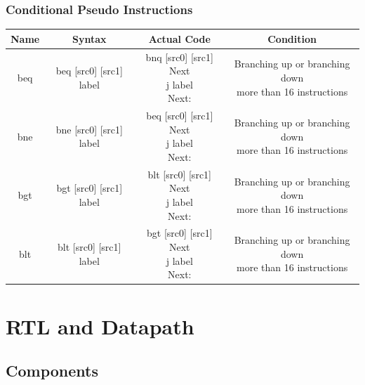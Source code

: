 \documentclass{article}
\begin{document}
		\subsubsection{Conditional Pseudo Instructions}
			\begin{center} \begin{tabular}{| c | c | c | c |} \hline
				Name & Syntax                    & Actual Code & Condition \\ \hline
				beq  & beq [src0] [src1] label & \thead{bnq [src0] [src1] Next \\ j label \\ Next:} & \thead{Branching up or branching down \\ more than 16 instructions}\\ \hline
				bne  & bne [src0] [src1] label & \thead{beq [src0] [src1] Next \\ j label \\ Next:} & \thead{Branching up or branching down \\ more than 16 instructions}\\ \hline
				bgt  & bgt [src0] [src1] label & \thead{blt [src0] [src1] Next \\ j label \\ Next:} & \thead{Branching up or branching down \\ more than 16 instructions}\\ \hline
				blt  & blt [src0] [src1] label & \thead{bgt [src0] [src1] Next \\ j label \\ Next:} & \thead{Branching up or branching down \\ more than 16 instructions}\\ \hline
			\end{tabular} \end{center}
\section{RTL and Datapath}
	\subsection{Components}
\end{document}
